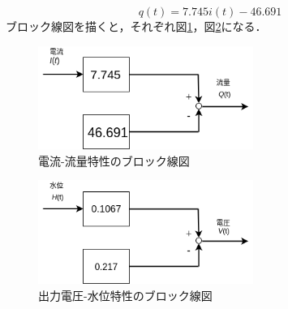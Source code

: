 \documentclass[12pt]{jsarticle}
\begin{document}
\begin{equation}
  q(t) = 7.745i(t) - 46.691
\end{equation}
ブロック線図を描くと，それぞれ図\ref{BlockDiagIQ}，図\ref{BlockDiagVH}になる．
\begin{figure}[p]
  \begin{center}
    \includegraphics[clip,width=7.0cm]{../img/BlockDiagIQ.png}
    \caption{電流-流量特性のブロック線図}
    \label{BlockDiagIQ}
  \end{center}
\end{figure}
\begin{figure}[p]
  \begin{center}
    \includegraphics[clip,width=7.0cm]{../img/BlockDiagHV.png}
    \caption{出力電圧-水位特性のブロック線図}
    \label{BlockDiagVH}
  \end{center}
\end{figure}
\end{document}
